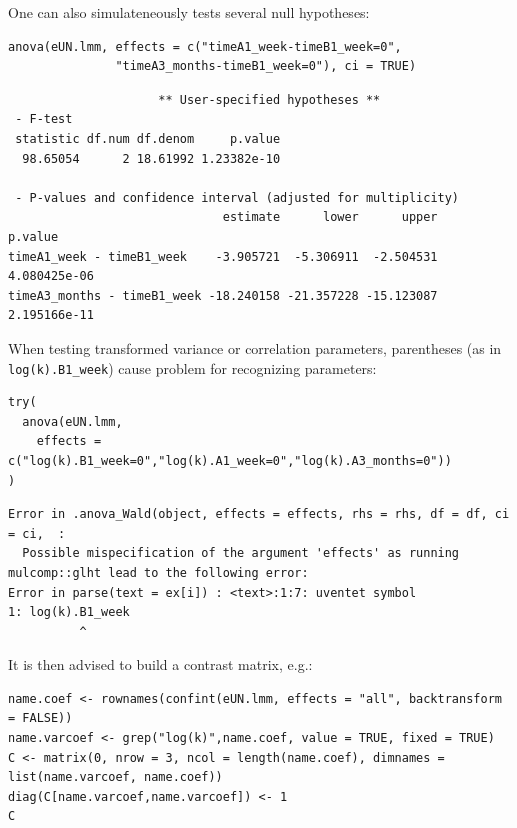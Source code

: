 \documentclass[12pt]{article}
\begin{document}
One can also simulateneously tests several null hypotheses:
\lstset{language=r,label= ,caption= ,captionpos=b,numbers=none}
\begin{lstlisting}
anova(eUN.lmm, effects = c("timeA1_week-timeB1_week=0",
			   "timeA3_months-timeB1_week=0"), ci = TRUE)
\end{lstlisting}

\begin{verbatim}
                     ** User-specified hypotheses ** 
 - F-test
 statistic df.num df.denom     p.value
  98.65054      2 18.61992 1.23382e-10

 - P-values and confidence interval (adjusted for multiplicity) 
                              estimate      lower      upper      p.value
timeA1_week - timeB1_week    -3.905721  -5.306911  -2.504531 4.080425e-06
timeA3_months - timeB1_week -18.240158 -21.357228 -15.123087 2.195166e-11
\end{verbatim}


\clearpage

When testing transformed variance or correlation parameters,
parentheses (as in \texttt{log(k).B1\_week}) cause problem for recognizing
parameters:
\lstset{language=r,label= ,caption= ,captionpos=b,numbers=none}
\begin{lstlisting}
try(
  anova(eUN.lmm,
	effects = c("log(k).B1_week=0","log(k).A1_week=0","log(k).A3_months=0"))
)
\end{lstlisting}

\begin{verbatim}
Error in .anova_Wald(object, effects = effects, rhs = rhs, df = df, ci = ci,  : 
  Possible mispecification of the argument 'effects' as running mulcomp::glht lead to the following error: 
Error in parse(text = ex[i]) : <text>:1:7: uventet symbol
1: log(k).B1_week
          ^
\end{verbatim}


It is then advised to build a contrast matrix, e.g.:
\lstset{language=r,label= ,caption= ,captionpos=b,numbers=none}
\begin{lstlisting}
name.coef <- rownames(confint(eUN.lmm, effects = "all", backtransform = FALSE))
name.varcoef <- grep("log(k)",name.coef, value = TRUE, fixed = TRUE)
C <- matrix(0, nrow = 3, ncol = length(name.coef), dimnames = list(name.varcoef, name.coef))
diag(C[name.varcoef,name.varcoef]) <- 1
C
\end{lstlisting}
\end{document}
